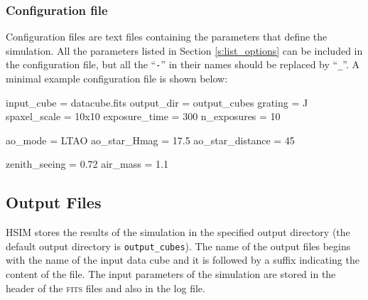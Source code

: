 \documentclass[12pt]{report}
\begin{document}
\subsubsection{Configuration file}\label{ss:conf_file}

Configuration files are text files containing the parameters that define the simulation. All the parameters listed in Section \ref{s:list_options} can be included in the configuration file, but all the ``\texttt{-}'' in their names should be replaced by ``\texttt{\_}''. A minimal example configuration file is shown below:

\begin{textfile}
[HSIM]
input_cube = datacube.fits
output_dir = output_cubes
grating = J
spaxel_scale = 10x10
exposure_time = 300
n_exposures = 10

ao_mode = LTAO
ao_star_Hmag = 17.5
ao_star_distance = 45

zenith_seeing = 0.72
air_mass = 1.1
\end{textfile}



\subsection{Output Files}\label{s:output}

HSIM stores the results of the simulation in the specified output directory (the default output directory is \texttt{output\_cubes}). The name of the output files begins with the name of the input data cube and it is followed by a suffix indicating the content of the file. The input parameters of the simulation are stored in the header of the \textsc{fits} files and also in the log file.
\end{document}
